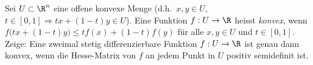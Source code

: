 \begin{prob} 
Sei $U\subset\R^n$ eine offene konvexe Menge (d.h.~$x,y\in U$,
$t\in[0,1]\Longrightarrow tx+(1-t)y\in U$). Eine Funktion $f:U\to\R$ 
heisst {\em konvex}, wenn $f\bigl(tx+(1-t)y\bigr)\leq tf(x) +
(1-t)f(y)$ f\"ur alle $x,y\in U$ und $t\in[0,1]$. Zeige: Eine zweimal
stetig differenzierbare Funktion $f:U\to\R$ ist genau dann konvex,
wenn die Hesse-Matrix von $f$ an jedem Punkt in $U$ positiv
semidefinit ist.
\end{prob}
